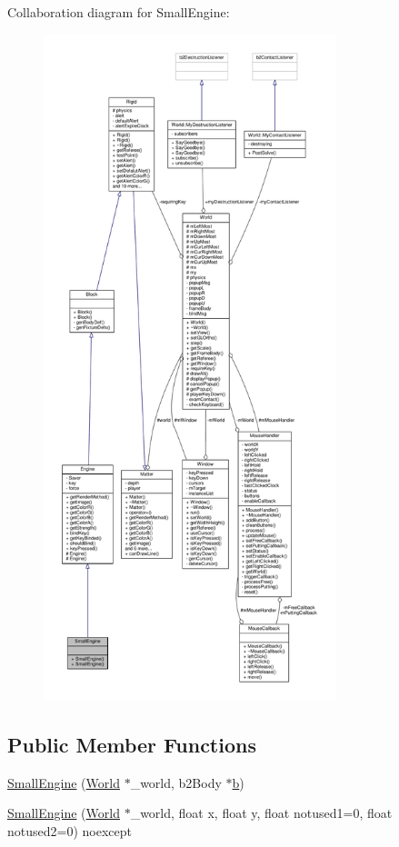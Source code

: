 Collaboration diagram for Small\+Engine\+:
\nopagebreak
\begin{figure}[H]
\begin{center}
\leavevmode
\includegraphics[height=550pt]{classSmallEngine__coll__graph}
\end{center}
\end{figure}
\subsection*{Public Member Functions}
\begin{DoxyCompactItemize}
\item 
\hyperlink{classSmallEngine_a76117f2efaa1d74f0c992bf0201c2244}{Small\+Engine} (\hyperlink{classWorld}{World} $\ast$\+\_\+world, b2\+Body $\ast$\hyperlink{image_8h_ab2d05693952610f937e5acb3c4a8fa1b}{b})
\item 
\hyperlink{classSmallEngine_a31761c59f4f039e5c735fec59191a531}{Small\+Engine} (\hyperlink{classWorld}{World} $\ast$\+\_\+world, float x, float y, float notused1=0, float notused2=0) noexcept
\end{DoxyCompactItemize}
